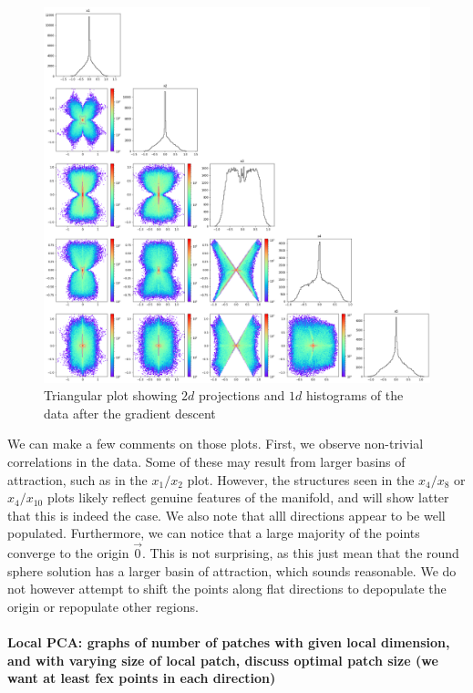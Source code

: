 \documentclass[11pt]{article}
\begin{document}
		\begin{figure}[t]
			\centering
			\includegraphics[scale = 0.25]{Figures/triangular_plot_1_2_4_8_10.png} %
			\caption{Triangular plot showing $2d$ projections and $1d$ histograms of the data after the gradient descent}
			\label{triangular_plot_1_2_4_8_10}
		\end{figure}
		
		We can make a few comments on those plots. First, we observe non-trivial correlations in the data. Some of these may result from larger basins of attraction, such as in the $x_1/x_2$ plot. However, the structures seen in the $x_4/x_8$ or $x_4/x_{10}$ plots likely reflect genuine features of the manifold, and will show latter that this is indeed the case. We also note that alll directions appear to be well populated. Furthermore, we can notice that a large majority of the points converge to the origin $\vec{0}$. This is not surprising, as this just mean that the round sphere solution has a larger basin of attraction, which sounds reasonable. We do not however attempt to shift the points along flat directions to depopulate the origin or repopulate other regions.

		\paragraph{Local PCA: graphs of number of patches with given local dimension, and with varying size of local patch, discuss optimal patch size (we want at least fex points in each direction)}
\end{document}
